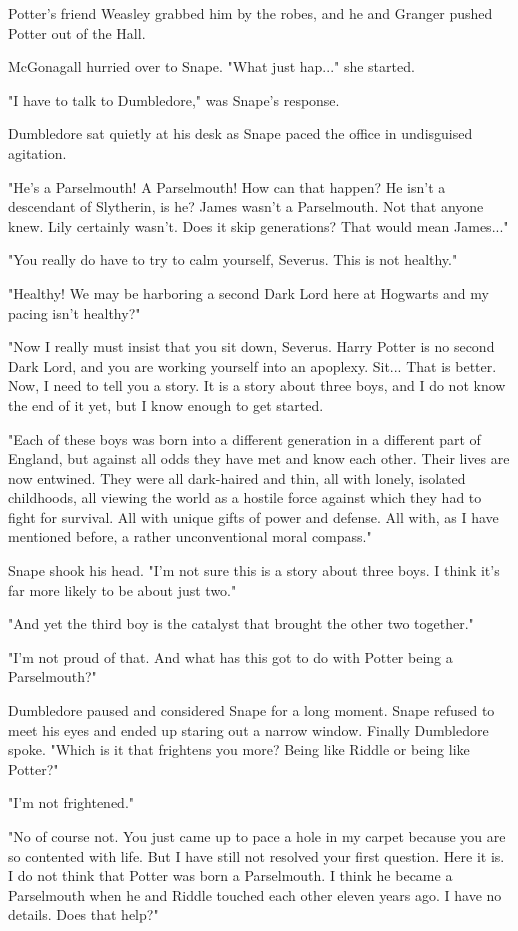 \documentclass[a4paper,11pt]{article}
\begin{document}
Potter's friend Weasley grabbed him by the robes, and he and Granger pushed Potter out of the Hall.

McGonagall hurried over to Snape. "What just hap..." she started.

"I have to talk to Dumbledore," was Snape's response.

Dumbledore sat quietly at his desk as Snape paced the office in undisguised agitation.

"He's a Parselmouth! A Parselmouth! How can that happen? He isn't a descendant of Slytherin, is he? James wasn't a Parselmouth. Not that anyone knew. Lily certainly wasn't. Does it skip generations? That would mean James..."

"You really do have to try to calm yourself, Severus. This is not healthy."

"Healthy! We may be harboring a second Dark Lord here at Hogwarts and my pacing isn't healthy?"

"Now I really must insist that you sit down, Severus. Harry Potter is no second Dark Lord, and you are working yourself into an apoplexy. Sit... That is better. Now, I need to tell you a story. It is a story about three boys, and I do not know the end of it yet, but I know enough to get started.

"Each of these boys was born into a different generation in a different part of England, but against all odds they have met and know each other. Their lives are now entwined. They were all dark-haired and thin, all with lonely, isolated childhoods, all viewing the world as a hostile force against which they had to fight for survival. All with unique gifts of power and defense. All with, as I have mentioned before, a rather unconventional moral compass."

Snape shook his head. "I'm not sure this is a story about three boys. I think it's far more likely to be about just two."

"And yet the third boy is the catalyst that brought the other two together."

"I'm not proud of that. And what has this got to do with Potter being a Parselmouth?"

Dumbledore paused and considered Snape for a long moment. Snape refused to meet his eyes and ended up staring out a narrow window. Finally Dumbledore spoke. "Which is it that frightens you more? Being like Riddle or being like Potter?"

"I'm not frightened."

"No of course not. You just came up to pace a hole in my carpet because you are so contented with life. But I have still not resolved your first question. Here it is. I do not think that Potter was born a Parselmouth. I think he became a Parselmouth when he and Riddle touched each other eleven years ago. I have no details. Does that help?"
\end{document}
